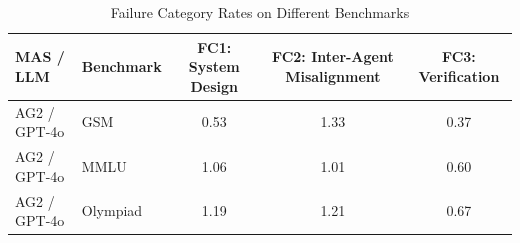 \begin{table}[ht!]
    \small
    \renewcommand{\arraystretch}{1.3}
    \setlength{\tabcolsep}{4pt}
    \centering
    \caption{Failure Category Rates on Different Benchmarks}
    \label{tab:fc-components}
    \begin{tabular}{p{2cm} p{1.4cm} c c c}
        \toprule
        \textbf{MAS / LLM} & \textbf{Benchmark} & \textbf{FC1: System Design} & \textbf{FC2: Inter-Agent Misalignment} & \textbf{FC3: Verification} \\
        \midrule
        AG2 / GPT-4o & GSM       & 0.53 & 1.33 & 0.37 \\
        AG2 / GPT-4o & MMLU      & 1.06 & 1.01 & 0.60 \\
        AG2 / GPT-4o & Olympiad  & 1.19 & 1.21 & 0.67 \\
        \bottomrule
    \end{tabular}
    \label{tab:failure_mode_rates_on_benchmarks}
\end{table}



